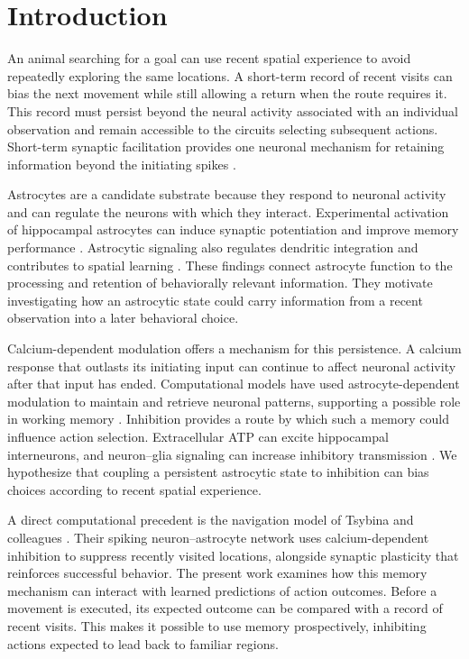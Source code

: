 \section{Introduction}
An animal searching for a goal can use recent spatial experience to avoid repeatedly exploring the same locations. A short-term record of recent visits can bias the next movement while still allowing a return when the route requires it. This record must persist beyond the neural activity associated with an individual observation and remain accessible to the circuits selecting subsequent actions. Short-term synaptic facilitation provides one neuronal mechanism for retaining information beyond the initiating spikes \cite{mongillo2008synaptic}. 

Astrocytes are a candidate substrate because they respond to neuronal activity and can regulate the neurons with which they interact. Experimental activation of hippocampal astrocytes can induce synaptic potentiation and improve memory performance \cite{adamsky2018astrocytic}. Astrocytic signaling also regulates dendritic integration and contributes to spatial learning \cite{bohmbach2022astrocytic}. These findings connect astrocyte function to the processing and retention of behaviorally relevant information. They motivate investigating how an astrocytic state could carry information from a recent observation into a later behavioral choice.

Calcium-dependent modulation offers a mechanism for this persistence. A calcium response that outlasts its initiating input can continue to affect neuronal activity after that input has ended. Computational models have used astrocyte-dependent modulation to maintain and retrieve neuronal patterns, supporting a possible role in working memory \cite{gordleeva2021working,depitta2022multiple}. Inhibition provides a route by which such a memory could influence action selection. Extracellular ATP can excite hippocampal interneurons, and neuron--glia signaling can increase inhibitory transmission \cite{bowser2004atp,torres2012extracellular}. We hypothesize that coupling a persistent astrocytic state to inhibition can bias choices according to recent spatial experience.

A direct computational precedent is the navigation model of Tsybina and colleagues \cite{tsybina2026}. Their spiking neuron--astrocyte network uses calcium-dependent inhibition to suppress recently visited locations, alongside synaptic plasticity that reinforces successful behavior. The present work examines how this memory mechanism can interact with learned predictions of action outcomes. Before a movement is executed, its expected outcome can be compared with a record of recent visits. This makes it possible to use memory prospectively, inhibiting actions expected to lead back to familiar regions.

